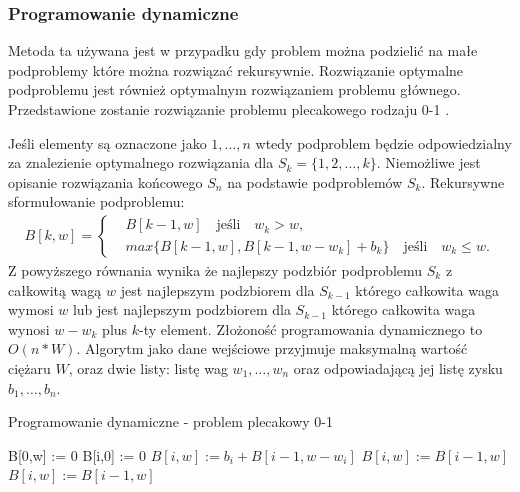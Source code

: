 \subsubsection{Programowanie dynamiczne}
Metoda ta używana jest w przypadku gdy problem można podzielić na małe podproblemy które można rozwiązać rekursywnie. Rozwiązanie optymalne podproblemu jest również optymalnym rozwiązaniem problemu głównego. Przedstawione zostanie rozwiązanie problemu plecakowego rodzaju 0-1 \cite{GoddardLecture}.

Jeśli elementy są oznaczone jako $1,\dots,n$ wtedy podproblem będzie odpowiedzialny za znalezienie optymalnego rozwiązania dla $S_k = \{1,2,\dots,k \}$. Niemożliwe jest opisanie rozwiązania końcowego $S_n$ na podstawie podproblemów $S_k$. Rekursywne sformułowanie podproblemu:
\begin{equation}\label{recursiveDynamic}
  \begin{aligned}
    B[k,w] =
    \begin{cases}
    & B[k-1,w] \quad \textrm{jeśli} \quad w_k > w, \\
    & max\{B[k-1,w], B[k-1,w-w_k] + b_k\} \quad \textrm{jeśli} \quad  w_k \le w.
    \end{cases}
  \end{aligned}
\end{equation}
Z powyższego równania wynika że najlepszy podzbiór podproblemu $S_k$ z całkowitą wagą $w$ jest najlepszym podzbiorem dla $S_{k-1}$ którego całkowita waga wymosi $w$ lub jest najlepszym podzbiorem dla $S_{k-1}$ którego całkowita waga wynosi $w-w_k$ plus $k$-ty element. Złożoność programowania dynamicznego to $O(n*W)$. Algorytm jako dane wejściowe przyjmuje maksymalną wartość ciężaru $W$, oraz dwie listy: listę wag $w_1,\dots,w_n$ oraz odpowiadającą jej listę zysku $b_1,\dots,b_n$.
\begin{algorithm}
  \caption{Programowanie dynamiczne - problem plecakowy 0-1}
  \begin{algorithmic}[1]
      \State B[0,w] := 0
    \EndFor
      \State B[i,0] := 0
    \EndFor
            \State $B[i,w] := b_i + B[i-1,w-w_i]$
          \Else
            \State $B[i,w] := B[i-1,w]$
          \EndIf
        \Else
          \State $B[i,w] := B[i-1,w]$
        \EndIf
      \EndFor
    \EndFor
  \end{algorithmic}
\end{algorithm}
